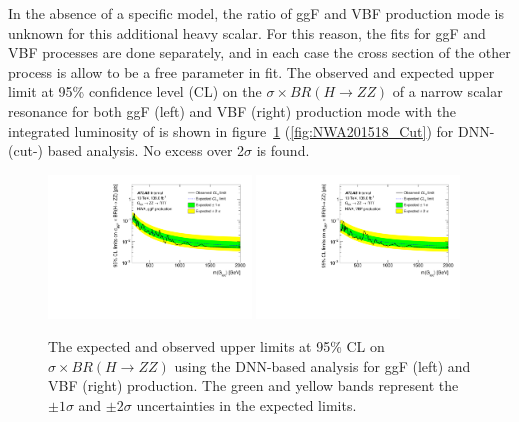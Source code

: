 In the absence of a specific model, the ratio of ggF and VBF production mode is unknown for this additional heavy scalar.
For this reason, the fits for ggF and VBF processes are done separately, and in each case the cross section of the other process is allow to be a free parameter in fit.
The observed and expected upper limit at 95\% confidence level (CL) on the $\sigma \times BR(H \rightarrow ZZ)$ of a narrow scalar resonance for both ggF (left) and VBF (right) production mode with the integrated luminosity of \lumi is shown in figure~\ref{fig:NWA201518_DNN} (\ref{fig:NWA201518_Cut}) for DNN- (cut-) based analysis.
No excess over 2$\sigma$ is found.

\begin{figure}[h]
    \centering
    \includegraphics[width=0.48\textwidth]{figures/HMHZZ/results/limits_DNN_ggF.pdf}
    \includegraphics[width=0.48\textwidth]{figures/HMHZZ/results/limits_DNN_VBF.pdf}
    \caption{The expected and observed upper limits at 95\% CL on $\sigma \times BR(H \rightarrow ZZ)$ using the DNN-based analysis for ggF (left) and VBF (right) production. The green and yellow bands represent the $\pm 1\sigma$ and $\pm 2\sigma$ uncertainties in the expected limits.
 }
    \label{fig:NWA201518_DNN}
\end{figure}

